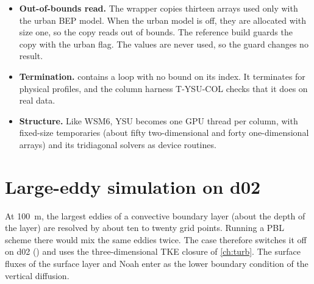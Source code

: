 \begin{portnote}
\begin{itemize}
  \item \textbf{Out-of-bounds read.} The wrapper copies thirteen arrays used only with the urban BEP model. When the
    urban model is off, they are allocated with size one, so the copy reads out of bounds. The reference build guards
    the copy with the urban flag. The values are never used, so the guard changes no result.
  \item \textbf{Termination.}  contains a  loop with no bound on its index. It terminates
    for physical profiles, and the column harness T-YSU-COL checks that it does on real data.
  \item \textbf{Structure.} Like WSM6, YSU becomes one GPU thread per column, with fixed-size temporaries (about fifty
    two-dimensional and forty one-dimensional arrays) and its tridiagonal solvers as device routines.
\end{itemize}
\end{portnote}

\section{Large-eddy simulation on d02}

At 100~m, the largest eddies of a convective boundary layer (about the depth of the layer) are resolved by about ten
to twenty grid points. Running a PBL scheme there would mix the same eddies twice. The case therefore switches it off
on d02 () and uses the three-dimensional TKE closure of \cref{ch:turb}. The surface fluxes
of the surface layer and Noah enter as the lower boundary condition of the vertical diffusion.
